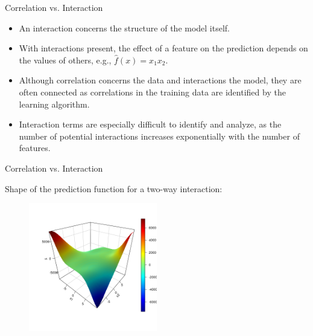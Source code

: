\documentclass[11pt,compress,t,notes=noshow, aspectratio=169, xcolor=table]{beamer}
\begin{document}


\begin{frame}{Correlation vs. Interaction}
\begin{itemize}
\item An interaction concerns the structure of the model itself.
\item With interactions present, the effect of a feature on the prediction depends on the values of others, e.g., $\widehat{f}(x) = x_1 x_2$.
\item Although correlation concerns the data and interactions the model, they are often connected as correlations in the training data are identified by the learning algorithm.
\item Interaction terms are especially difficult to identify and analyze, as the number of potential interactions increases exponentially with the number of features.
\end{itemize}
\end{frame}

\begin{frame}{Correlation vs. Interaction}

Shape of the prediction function for a two-way interaction:

\begin{figure}
\includegraphics[width = 0.5\textwidth]{figure/interaction}
\end{figure}
\end{frame}
\end{document}
